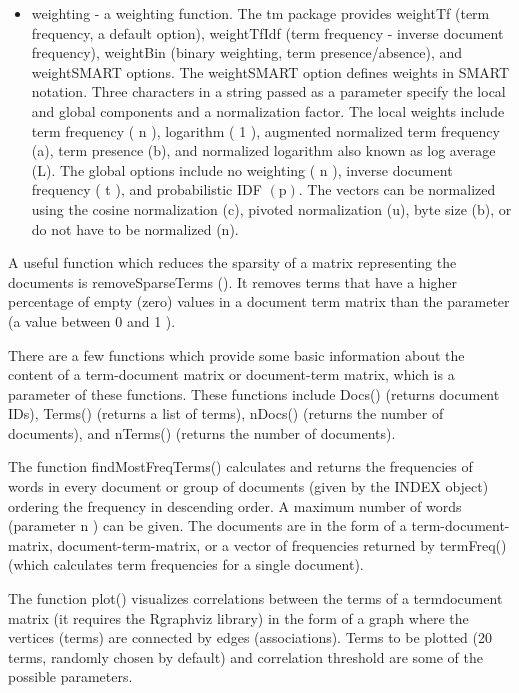 \documentclass[10pt]{book}
\begin{document}
\begin{itemize}
  \item weighting - a weighting function. The tm package provides weightTf (term frequency, a default option), weightTfIdf (term frequency - inverse document frequency), weightBin (binary weighting, term presence/absence), and weightSMART options. The weightSMART option defines weights in SMART notation. Three characters in a string passed as a parameter specify the local and global components and a normalization factor. The local weights include term frequency ( n ), logarithm ( 1 ), augmented normalized term frequency (a), term presence (b), and normalized logarithm also known as log average (L). The global options include no weighting ( n ), inverse document frequency ( t ), and probabilistic IDF $(\mathrm{p})$. The vectors can be normalized using the cosine normalization (c), pivoted normalization (u), byte size (b), or do not have to be normalized (n).
\end{itemize}

A useful function which reduces the sparsity of a matrix representing the documents is removeSparseTerms (). It removes terms that have a higher percentage of empty (zero) values in a document term matrix than the parameter (a value between 0 and 1 ).

There are a few functions which provide some basic information about the content of a term-document matrix or document-term matrix, which is a parameter of these functions. These functions include Docs() (returns document IDs), Terms() (returns a list of terms), nDocs() (returns the number of documents), and nTerms() (returns the number of documents).

The function findMostFreqTerms() calculates and returns the frequencies of words in every document or group of documents (given by the INDEX object) ordering the frequency in descending order. A maximum number of words (parameter n ) can be given. The documents are in the form of a term-document-matrix, document-term-matrix, or a vector of frequencies returned by termFreq()(which calculates term frequencies for a single document).

The function plot() visualizes correlations between the terms of a termdocument matrix (it requires the Rgraphviz library) in the form of a graph where the vertices (terms) are connected by edges (associations). Terms to be plotted (20 terms, randomly chosen by default) and correlation threshold are some of the possible parameters.
\end{document}
